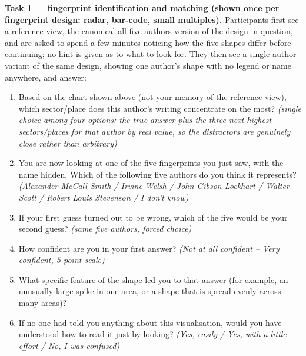 \documentclass[logo,msc]{infthesis}
\begin{document}
\textbf{Task 1 --- fingerprint identification and matching (shown once per fingerprint design: radar, bar-code, small multiples).} Participants first see a reference view, the canonical all-five-authors version of the design in question, and are asked to spend a few minutes noticing how the five shapes differ before continuing; no hint is given as to what to look for. They then see a single-author variant of the same design, showing one author's shape with no legend or name anywhere, and answer:
\begin{enumerate}
  \item Based on the chart shown above (not your memory of the reference view), which sector/place does this author's writing concentrate on the most? \emph{(single choice among four options: the true answer plus the three next-highest sectors/places for that author by real value, so the distractors are genuinely close rather than arbitrary)}
  \item You are now looking at one of the five fingerprints you just saw, with the name hidden. Which of the following five authors do you think it represents? \emph{(Alexander McCall Smith / Irvine Welsh / John Gibson Lockhart / Walter Scott / Robert Louis Stevenson / I don't know)}
  \item If your first guess turned out to be wrong, which of the five would be your second guess? \emph{(same five authors, forced choice)}
  \item How confident are you in your first answer? \emph{(Not at all confident -- Very confident, 5-point scale)}
  \item What specific feature of the shape led you to that answer (for example, an unusually large spike in one area, or a shape that is spread evenly across many areas)?
  \item If no one had told you anything about this visualisation, would you have understood how to read it just by looking? \emph{(Yes, easily / Yes, with a little effort / No, I was confused)}
\end{enumerate}
\end{document}

